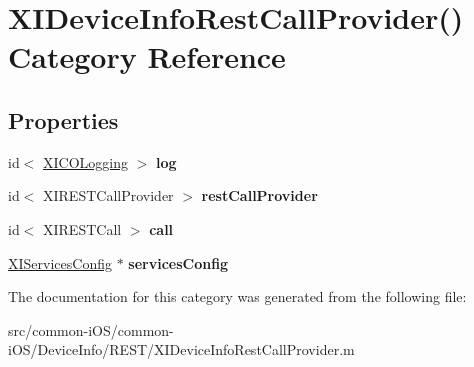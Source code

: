 \hypertarget{category_x_i_device_info_rest_call_provider_07_08}{}\section{X\+I\+Device\+Info\+Rest\+Call\+Provider() Category Reference}
\label{category_x_i_device_info_rest_call_provider_07_08}
\subsection*{Properties}
\begin{DoxyCompactItemize}
\item 
\hypertarget{category_x_i_device_info_rest_call_provider_07_08_a6f2ed9cc60ab7409409aa0399ac3fa9d}{}\label{category_x_i_device_info_rest_call_provider_07_08_a6f2ed9cc60ab7409409aa0399ac3fa9d} 
id$<$ \hyperlink{protocol_x_i_c_o_logging-p}{X\+I\+C\+O\+Logging} $>$ {\bfseries log}
\item 
\hypertarget{category_x_i_device_info_rest_call_provider_07_08_ab361c44499a28f69b160cde8cc22a4ef}{}\label{category_x_i_device_info_rest_call_provider_07_08_ab361c44499a28f69b160cde8cc22a4ef} 
id$<$ X\+I\+R\+E\+S\+T\+Call\+Provider $>$ {\bfseries rest\+Call\+Provider}
\item 
\hypertarget{category_x_i_device_info_rest_call_provider_07_08_a95b45fa739b355c27b575c6b3d8d0bc9}{}\label{category_x_i_device_info_rest_call_provider_07_08_a95b45fa739b355c27b575c6b3d8d0bc9} 
id$<$ X\+I\+R\+E\+S\+T\+Call $>$ {\bfseries call}
\item 
\hypertarget{category_x_i_device_info_rest_call_provider_07_08_ad78a87d9db2d6134f3f2f125edb55d15}{}\label{category_x_i_device_info_rest_call_provider_07_08_ad78a87d9db2d6134f3f2f125edb55d15} 
\hyperlink{interface_x_i_services_config}{X\+I\+Services\+Config} $\ast$ {\bfseries services\+Config}
\end{DoxyCompactItemize}


The documentation for this category was generated from the following file\+:\begin{DoxyCompactItemize}
\item 
src/common-\/i\+O\+S/common-\/i\+O\+S/\+Device\+Info/\+R\+E\+S\+T/X\+I\+Device\+Info\+Rest\+Call\+Provider.\+m\end{DoxyCompactItemize}

